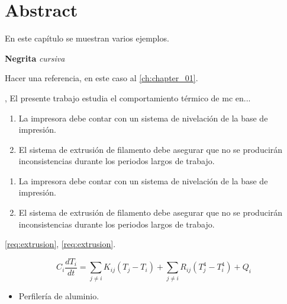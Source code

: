 \chapter{Abstract} \label{ch:chapter_01}

En este capítulo se muestran varios ejemplos.

\textbf{Negrita} \textit{cursiva}

Hacer una referencia, en este caso al \autoref{ch:chapter_01}.



\cite{im78552}, 
\glsresetall %
El presente trabajo estudia el comportamiento térmico de \gls{mc} en...

\begin{enumerate}
	\item La impresora debe contar con un sistema de nivelación de la base de impresión.
	\item El sistema de extrusión de filamento debe asegurar que no se producirán inconsistencias durante los periodos largos de trabajo.
\end{enumerate}


\begin{enumerate}[label= \textbf{R-\arabic*}]
	\item La impresora debe contar con un sistema de nivelación de la base de impresión.
	\item El sistema de extrusión de filamento debe asegurar que no se producirán inconsistencias durante los periodos largos de trabajo. \label{req:extrusion}
\end{enumerate}

\ref{req:extrusion}, \autoref{req:extrusion}.

\begin{equation}
    C_i \frac{dT_i}{dt}
= 
\sum_{j \neq i} K_{ij} (T_j - T_i)
+
\sum_{j \neq i} R_{ij} (T_j^4 - T_i^4)
+
Q_i
\end{equation}

\begin{itemize}[label={\scriptsize\raisebox{0.5ex}{\textbullet}}]

	\item Perfilería de aluminio.

\end{itemize}



